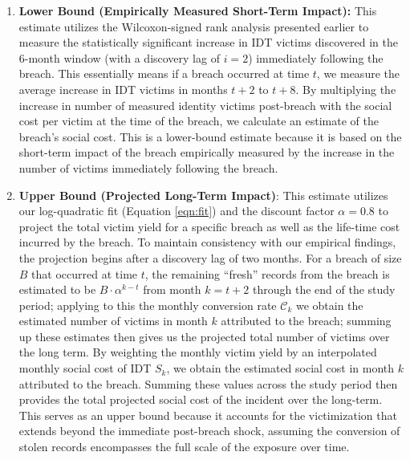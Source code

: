 \begin{enumerate}[label=(\alph*)]
\item \textbf{Lower Bound (Empirically Measured Short-Term Impact):} This estimate utilizes the Wilcoxon-signed rank analysis presented earlier to measure the statistically significant increase in IDT victims discovered in the 6-month window (with a discovery lag of $i=2$) immediately following the breach. This essentially means if a breach occurred at time $t$, we measure the average increase in IDT victims in months $t+2$ to $t+8$.
By multiplying the increase in number of measured identity victims post-breach with the social cost per victim at the time of the breach, we calculate an estimate of the breach's social cost. This is a lower-bound estimate because it is based on the short-term impact of the breach empirically measured by the increase in the number of victims immediately following the breach. 

\item \textbf{Upper Bound (Projected Long-Term Impact)}: This estimate utilizes our log-quadratic fit (Equation \ref{eqn:fit}) and the discount factor $\alpha = 0.8$ to project the total victim yield for a specific breach as well as the life-time cost incurred by the breach. To maintain consistency with our empirical findings, the projection begins after a discovery lag of two months. For a breach of size $B$ that occurred at time $t$, the remaining ``fresh'' records from the breach is estimated to be $B \cdot \alpha^{k-t}$ from month $k=t+2$ through the end of the study period; applying to this the monthly conversion rate $\mathcal{C}_k$ we obtain the estimated number of victims in month $k$ attributed to the breach; summing up these estimates then gives us the projected total number of victims over the long term. By weighting the monthly victim yield by an interpolated monthly social cost of IDT $S_k$, we obtain the estimated social cost in month $k$ attributed to the breach. Summing these values across the study period then provides the total projected social cost of the incident over the long-term. 
%
This serves as an upper bound because it accounts for the victimization that extends beyond the immediate post-breach shock, assuming the conversion of stolen records encompasses the full scale of the exposure over time.




\end{enumerate}
